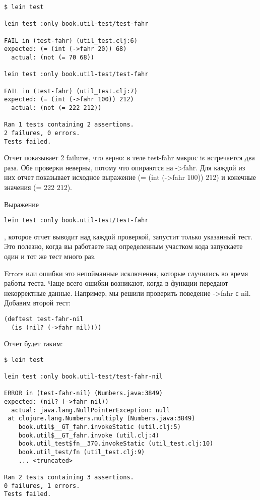 \begin{verbatim}
$ lein test

lein test :only book.util-test/test-fahr

FAIL in (test-fahr) (util_test.clj:6)
expected: (= (int (->fahr 20)) 68)
  actual: (not (= 70 68))

lein test :only book.util-test/test-fahr

FAIL in (test-fahr) (util_test.clj:7)
expected: (= (int (->fahr 100)) 212)
  actual: (not (= 222 212))

Ran 1 tests containing 2 assertions.
2 failures, 0 errors.
Tests failed.
\end{verbatim}

Отчет показывает 2 failures, что верно: в теле test-fahr макрос is встречается
два раза. Обе проверки неверны, потому что опираются на ->fahr. Для каждой из
них отчет показывает исходное выражение (= (int (->fahr 100)) 212) и конечные
значения (= 222 212).

Выражение

\begin{verbatim}
lein test :only book.util-test/test-fahr
\end{verbatim}

, которое отчет выводит над каждой проверкой, запустит только указанный
тест. Это полезно, когда вы работаете над определенным участком кода запускаете
один и тот же тест много раз.

Errors или ошибки это непойманные исключения, которые случились во время работы
теста. Чаще всего ошибки возникают, когда в функции передают некорректные
данные. Например, мы решили проверить поведение ->fahr с nil. Добавим второй
тест:

\begin{verbatim}
(deftest test-fahr-nil
  (is (nil? (->fahr nil))))
\end{verbatim}

Отчет будет таким:

\begin{verbatim}
$ lein test

lein test :only book.util-test/test-fahr-nil

ERROR in (test-fahr-nil) (Numbers.java:3849)
expected: (nil? (->fahr nil))
  actual: java.lang.NullPointerException: null
 at clojure.lang.Numbers.multiply (Numbers.java:3849)
    book.util$__GT_fahr.invokeStatic (util.clj:5)
    book.util$__GT_fahr.invoke (util.clj:4)
    book.util_test$fn__370.invokeStatic (util_test.clj:10)
    book.util_test/fn (util_test.clj:9)
    ... <truncated>

Ran 2 tests containing 3 assertions.
0 failures, 1 errors.
Tests failed.
\end{verbatim}

